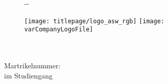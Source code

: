 \makeatletter
\begin{titlepage}
    \begin{figure}[t]
        \begin{adjustwidth}{-\oddsidemargin-1in}{-\rightmargin}
            
            \minipage{0pt}
              \noindent
            \endminipage
            
            \vspace*{10mm}
            \minipage{0.075\paperwidth}
              \hfill
            \endminipage
            \minipage{0.2475\paperwidth}
              \texttt{[image: titlepage/logo\_asw\_rgb]}
            \endminipage
            \minipage{0.275\paperwidth}
                \hfill
            \endminipage
            \minipage{0.2475\paperwidth}
                \ifdefined\varCompanyLogoFile
                  \texttt{[image: \\varCompanyLogoFile]}
                \else
                  \hfill
                \fi
            \endminipage

        \end{adjustwidth}
    \end{figure}

    \vspace*{2cm}

    \begin{flushleft}
        \Huge
        \textbf{\@title}\\[2cm]

        \LARGE
        {\@author}\\[0.5cm]

        \large
        Martrikelnummer: \varMartrikelnummer \\[0.5cm]

        \Large
        \varArbeit{} im Studiengang\\
        \varStudiengang
    \end{flushleft}

    \vspace{0.5cm}

    \begin{flushright}


\end{flushright}
\end{titlepage}
